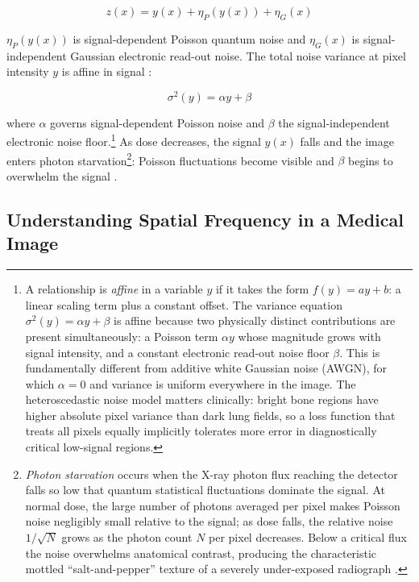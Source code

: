 \documentclass[12pt, a4paper, twoside, openright]{book}
\begin{document}
\begin{equation}
\label{eq:intro:noise}
z(x) = y(x) + \eta_P(y(x)) + \eta_G(x)
\end{equation}

$\eta_P(y(x))$ is signal-dependent Poisson quantum noise and $\eta_G(x)$ is signal-independent Gaussian electronic read-out noise. The total noise variance at pixel intensity $y$ is affine in signal \cite{foi_practical_2008, borges_noise_2020}:

\begin{equation}
\label{eq:intro:variance}
\sigma^2(y) = \alpha y + \beta
\end{equation}

where $\alpha$ governs signal-dependent Poisson noise and $\beta$ the signal-independent electronic noise floor.\footnote{A relationship is \emph{affine} in a variable $y$ if it takes the form $f(y) = ay + b$: a linear scaling term plus a constant offset. The variance equation $\sigma^2(y) = \alpha y + \beta$ is affine because two physically distinct contributions are present simultaneously: a Poisson term $\alpha y$ whose magnitude grows with signal intensity, and a constant electronic read-out noise floor $\beta$. This is fundamentally different from additive white Gaussian noise (AWGN), for which $\alpha = 0$ and variance is uniform everywhere in the image. The heteroscedastic noise model matters clinically: bright bone regions have higher absolute pixel variance than dark lung fields, so a loss function that treats all pixels equally implicitly tolerates more error in diagnostically critical low-signal regions.} As dose decreases, the signal $y(x)$ falls and the image enters photon starvation\footnote{\emph{Photon starvation} occurs when the X-ray photon flux reaching the detector falls so low that quantum statistical fluctuations dominate the signal. At normal dose, the large number of photons averaged per pixel makes Poisson noise negligibly small relative to the signal; as dose falls, the relative noise $1/\sqrt{N}$ grows as the photon count $N$ per pixel decreases. Below a critical flux the noise overwhelms anatomical contrast, producing the characteristic mottled ``salt-and-pepper'' texture of a severely under-exposed radiograph \cite{borges_noise_2020}.}: Poisson fluctuations become visible and $\beta$ begins to overwhelm the signal \cite{foi_practical_2008}.

\subsection{Understanding Spatial Frequency in a Medical Image}
\label{sec:intro:tradeoff:frequency}
\end{document}
